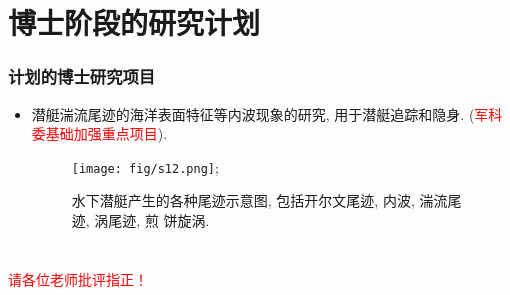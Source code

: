\documentclass[UTF8]{ctexbeamer}	%
\theoremstyle{plain}
\theoremstyle{definition}
\theoremstyle{remark}
\numberwithin{equation}{section}
\begin{document}
\section{博士阶段的研究计划}
\begin{frame}
    \frametitle{计划的博士研究项目}
    \begin{itemize}
        \item 潜艇湍流尾迹的海洋表面特征等内波现象的研究, 用于潜艇追踪和隐身.
        (\textcolor{red}{军科委基础加强重点项目}).
        \begin{figure}
            \texttt{[image: fig/s12.png]};
            \caption{水下潜艇产生的各种尾迹示意图, 包括开尔文尾迹, 内波, 湍流尾迹, 涡尾迹, 煎
            饼旋涡.}
        \end{figure}
    \end{itemize}
\end{frame}

\section*{}
\begin{frame}
    \centering\huge
    \textcolor{red}{请各位老师批评指正！}
\end{frame}
\end{document}

